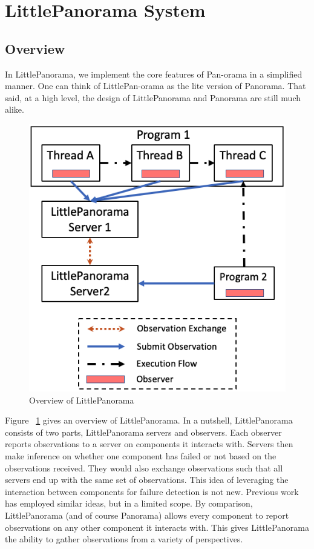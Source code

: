 \section{LittlePanorama System}
\subsection{Overview}
In LittlePanorama, we implement the core features of Pan-orama in a simplified manner. One can think of LittlePan-orama as the lite version of Panorama. That said, at a high level, the design of LittlePanorama and Panorama are still much alike. 

\begin{figure}[!tb]
\centering
\includegraphics[width=\columnwidth]{figs/overview.png}
\vspace{-1em}
\caption{Overview of LittlePanorama
\label{fig:overview}
}
\end{figure}

Figure ~\ref{fig:overview} gives an overview of LittlePanorama. In a nutshell, LittlePanorama consists of two parts, LittlePanorama servers and observers. Each observer reports observations to a server on components it interacts with. Servers then make inference on whether one component has failed or not based on the observations received. They would also exchange observations such that all servers end up with the same set of observations. This idea of leveraging the interaction between components for failure detection is not new. Previous work ~\cite{van1998gossip} has employed similar ideas, but in a limited scope. By comparison, LittlePanorama (and of course Panorama) allows every component to report observations on any other component it interacts with. This gives LittlePanorama the ability to gather observations from a variety of perspectives. 

